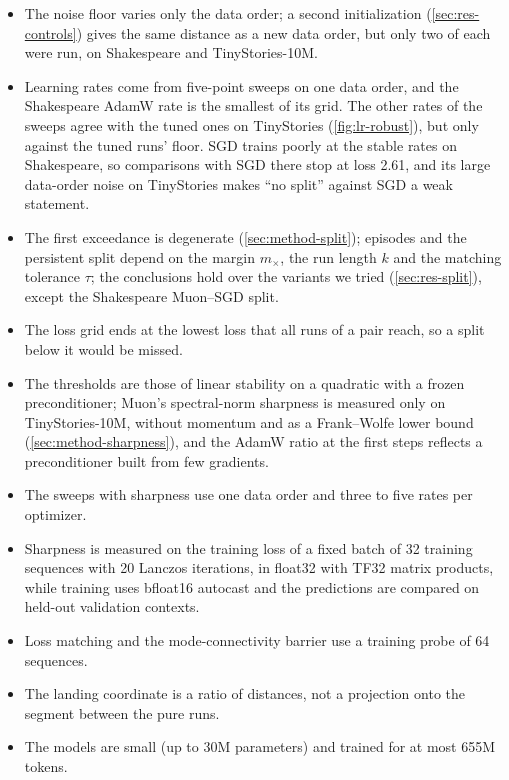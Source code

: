 \documentclass[10pt]{article}
\makeatletter
\renewcommand\paragraph{\@startsection{paragraph}{4}{\z@}{1.2ex \@plus .4ex \@minus .2ex}{-1em}{\normalfont\normalsize\bfseries}}
\makeatother
\begin{document}
\paragraph{Limitations.}
\begin{itemize}
\item The noise floor varies only the data order; a second initialization (\cref{sec:res-controls}) gives the same
  distance as a new data order, but only two of each were run, on Shakespeare and TinyStories-10M.
\item Learning rates come from five-point sweeps on one data order, and the Shakespeare AdamW rate is the
  smallest of its grid. The other rates of the sweeps agree with the tuned ones on TinyStories
  (\cref{fig:lr-robust}), but only against the tuned runs' floor. SGD trains poorly at the stable rates on Shakespeare, so comparisons with SGD there stop
  at loss 2.61, and its large data-order noise on TinyStories makes ``no split'' against SGD a weak statement.
\item The first exceedance is degenerate (\cref{sec:method-split}); episodes and the persistent split depend on
  the margin $m_\times$, the run length $k$ and the matching tolerance $\tau$; the conclusions hold over the
  variants we tried (\cref{sec:res-split}), except the Shakespeare Muon--SGD split.
\item The loss grid ends at the lowest loss that all runs of a pair reach, so a split below it would be missed.
\item The thresholds are those of linear stability on a quadratic with a frozen preconditioner; Muon's
  spectral-norm sharpness is measured only on TinyStories-10M, without momentum and as a Frank--Wolfe lower bound
  (\cref{sec:method-sharpness}), and the AdamW ratio at the first steps reflects a preconditioner built from few
  gradients.
\item The sweeps with sharpness use one data order and three to five rates per optimizer.
\item Sharpness is measured on the training loss of a fixed batch of 32 training sequences with 20 Lanczos
  iterations, in float32 with TF32 matrix products, while training uses bfloat16 autocast and the predictions are
  compared on held-out validation contexts.
\item Loss matching and the mode-connectivity barrier use a training probe of 64 sequences.
\item The landing coordinate is a ratio of distances, not a projection onto the segment between the pure
  runs.
\item The models are small (up to 30M parameters) and trained for at most 655M tokens.
\end{itemize}
\end{document}
